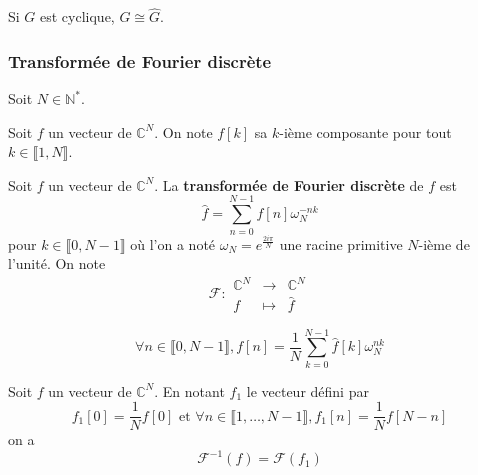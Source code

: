   \begin{corollary}
    Si $G$ est cyclique, $G \cong \widehat{G}$.
  \end{corollary}

  \subsubsection{Transformée de Fourier discrète}


  Soit $N \in \mathbb{N}^*$.

  \begin{notation}
    Soit $f$ un vecteur de $\mathbb{C}^{N}$. On note $f[k]$ sa $k$-ième composante pour tout $k \in \llbracket 1, N \rrbracket$.
  \end{notation}

  \begin{definition}
    Soit $f$ un vecteur de $\mathbb{C}^{N}$.
    La \textbf{transformée de Fourier discrète} de $f$ est
    \[ \widehat{f} = \sum_{n=0}^{N-1} f[n] \omega_N^{-nk} \]
    pour $k \in \llbracket 0, N-1 \rrbracket$ où l'on a noté $\omega_N = e^{\frac{2i\pi}{N}}$ une racine primitive $N$-ième de l'unité.
    On note
    \[
    \mathcal{F} :
    \begin{array}{ccc}
      \mathbb{C}^{N} &\rightarrow& \mathbb{C}^{N} \\
      f &\mapsto& \widehat{f}
    \end{array}
    \]
  \end{definition}

  \begin{proposition}
    \[ \forall n \in \llbracket 0, N-1 \rrbracket, f[n] = \frac{1}{N} \sum_{k=0}^{N-1} \widehat{f}[k] \omega_N^{nk} \]
  \end{proposition}

  \begin{corollary}
    Soit $f$ un vecteur de $\mathbb{C}^{N}$. En notant $f_1$ le vecteur défini par
    \[ f_1[0] = \frac{1}{N} f[0] \text{ et } \forall n \in \llbracket 1, \dots, N-1 \rrbracket, f_1[n] = \frac{1}{N} f[N-n] \]
    on a
    \[ \mathcal{F}^{-1}(f) = \mathcal{F}(f_1) \]
  \end{corollary}

  \annexessection


